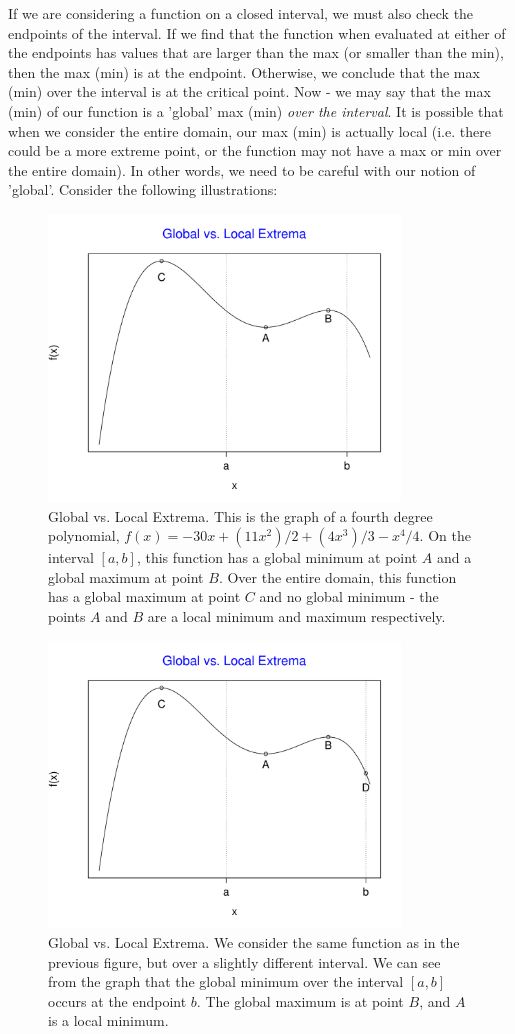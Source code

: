\documentclass[12pt,a4paper]{article} %
\begin{document}
If we are considering a function on a closed interval, we must also check the endpoints of the interval.  If we find that the function when evaluated at either of the endpoints has values that are larger than the max (or smaller than the min), then the max (min) is at the endpoint.  Otherwise, we conclude that the max (min) over the interval is at the critical point.  Now - we may say that the max (min) of our function is a 'global' max (min) \emph{over the interval}.  It is possible that when we consider the entire domain, our max (min) is actually local (i.e. there could be a more extreme point, or the function may not have a max or min over the entire domain).  In other words, we need to be careful with our notion of 'global'. Consider the following illustrations:
\begin{figure}[H]
\includegraphics[height=3in]{Extrema1.pdf}
\caption{Global vs. Local Extrema.  This is the graph of a fourth degree polynomial, $f(x)= -30x + (11x^2)/2 + (4x^3)/3 - x^4/4$.   On the interval $[a,b]$, this function has a global minimum at point $A$ and a global maximum at point $B$.  Over the entire domain, this function has a global maximum at point $C$ and no global minimum - the points $A$ and $B$ are a local minimum and maximum respectively.}
\end{figure}
\begin{figure}[H]
\includegraphics[height=3in]{Extrema2.pdf}
\caption{Global vs. Local Extrema.  We consider the same function as in the previous figure, but over a slightly different interval.  We can see from the graph that the global minimum over the interval $[a,b]$ occurs at the endpoint $b$.  The global maximum is at point $B$, and $A$ is a local minimum.}
\end{figure} 
\end{document}
